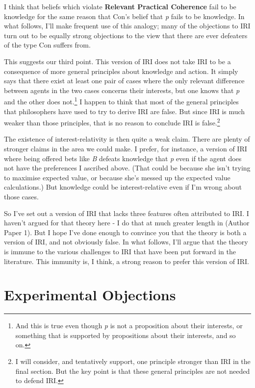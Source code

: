 \documentclass[
  11pt,
  letterpaper,
  DIV=11,
  numbers=noendperiod,
  twoside]{scrartcl}
\begin{document}
I think that beliefs which violate \textbf{Relevant Practical Coherence}
fail to be knowledge for the same reason that Con's belief that \emph{p}
fails to be knowledge. In what follows, I'll make frequent use of this
analogy; many of the objections to IRI turn out to be equally strong
objections to the view that there are ever defeaters of the type Con
suffers from.

This suggests our third point. This version of IRI does not take IRI to
be a consequence of more general principles about knowledge and action.
It simply says that there exist at least one pair of cases where the
only relevant difference between agents in the two cases concerns their
interests, but one knows that \emph{p} and the other does
not.\footnote{And this is true even though \emph{p} is not a proposition
  about their interests, or something that is supported by propositions
  about their interests, and so on.} I happen to think that most of the
general principles that philosophers have used to try to derive IRI are
false. But since IRI is much weaker than those principles, that is no
reason to conclude IRI is false.\footnote{I will consider, and
  tentatively support, one principle stronger than IRI in the final
  section. But the key point is that these general principles are not
  needed to defend IRI.}

The existence of interest-relativity is then quite a weak claim. There
are plenty of stronger claims in the area we could make. I prefer, for
instance, a version of IRI where being offered bets like \emph{B}
defeats knowledge that \emph{p} even if the agent does not have the
preferences I ascribed above. (That could be because she isn't trying to
maximise expected value, or because she's messed up the expected value
calculations.) But knowledge could be interest-relative even if I'm
wrong about those cases.

So I've set out a version of IRI that lacks three features often
attributed to IRI. I haven't argued for that theory here - I do that at
much greater length in (Author Paper 1). But I hope I've done enough to
convince you that the theory is both a version of IRI, and not obviously
false. In what follows, I'll argue that the theory is immune to the
various challenges to IRI that have been put forward in the literature.
This immunity is, I think, a strong reason to prefer this version of
IRI.

\section{Experimental Objections}\label{sect:xphi}
\end{document}
